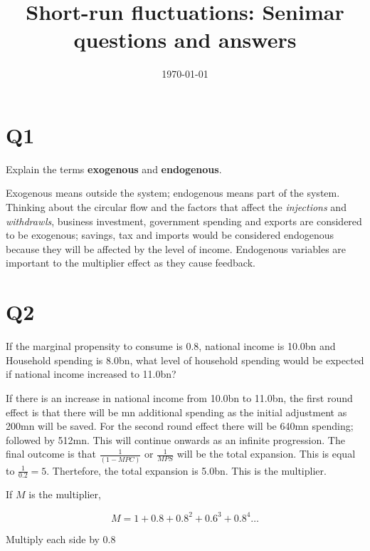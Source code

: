 \documentclass[12pt, a4paper, oneside]{article}\usepackage{graphicx, color}
\begin{document}
\title{Short-run fluctuations:  Senimar questions and answers}
\date{\today}
\maketitle
\section*{Q1}
Explain the terms \textbf{exogenous} and \textbf{endogenous}. 

Exogenous means outside the system; endogenous means part of the system.  Thinking about the circular flow and the factors that affect the \emph{injections} and \emph{withdrawls}, business investment, government spending and exports are considered to be exogenous; savings, tax and imports would be considered endogenous because they will be affected by the level of income.  Endogenous variables are important to the multiplier effect as they cause feedback. 

\section*{Q2}
If the marginal propensity to consume is 0.8, national income is \textsterling 10.0bn and Household spending is \textsterling 8.0bn, what level of household spending would be expected if national income increased to \textsterling 11.0bn?

If there is an increase in national income from \textsterling 10.0bn to \textsterling 11.0bn, the first round effect is that there will be  mn additional spending as the initial adjustment as \textsterling 200mn will be saved.  For the second round effect there will be \textsterling 640mn spending; followed by \textsterling 512mn.  This will continue onwards as an infinite progression.  The final outcome is that $\frac{1}{(1 - MPC)}$ or $\frac{1}{MPS}$ will be the total expansion.  This is equal to $\frac{1}{0.2} = 5$.  Thertefore, the total expansion is \textsterling 5.0bn.  This is the multiplier. 

If $M$ is the multiplier, 

\begin{equation}\label{eq1}
M = 1 + 0.8 + 0.8^2 + 0.6^3 +0.8^4 \dots
\end{equation}

Multiply each side by 0.8
\end{document}
